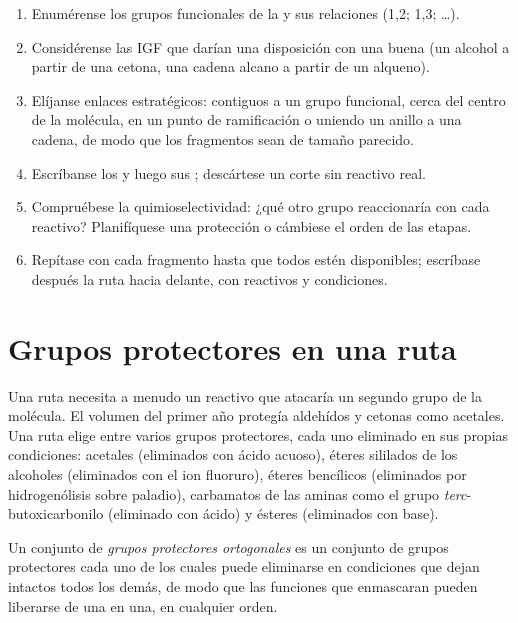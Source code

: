 \begin{method}\label{met:b2:retrosynthesis:retrosynthesis}
\begin{enumerate}
  \item Enumérense los grupos funcionales de la  y sus relaciones (1,2; 1,3; \dots).
  \item Considérense las IGF que darían una disposición con una buena  (un alcohol a partir de una cetona, una
        cadena alcano a partir de un alqueno).
  \item Elíjanse enlaces estratégicos: contiguos a un grupo funcional, cerca del centro de la molécula, en un
        punto de ramificación o uniendo un anillo a una cadena, de modo que los fragmentos sean de tamaño parecido.
  \item Escríbanse los  y luego sus ; descártese un corte sin reactivo real.
  \item Compruébese la quimioselectividad: ¿qué otro grupo reaccionaría con cada reactivo? Planifíquese una protección
        o cámbiese el orden de las etapas.
  \item Repítase con cada fragmento hasta que todos estén disponibles; escríbase después la ruta hacia delante, con reactivos y
        condiciones.
\end{enumerate}
\end{method}

\section{Grupos protectores en una ruta}

Una ruta necesita a menudo un reactivo que atacaría un segundo grupo de la molécula. El volumen del primer año
protegía aldehídos y cetonas como acetales. Una ruta elige entre varios grupos protectores, cada uno
eliminado en sus propias condiciones: acetales (eliminados con ácido acuoso), éteres sililados de los alcoholes (eliminados con el
ion fluoruro), éteres bencílicos (eliminados por hidrogenólisis sobre paladio), carbamatos de las aminas como
el grupo \textit{terc}-butoxicarbonilo (eliminado con ácido) y ésteres (eliminados con base).

\begin{definition}\label{def:b2:retrosynthesis:orthogonal}
Un conjunto de \emph{grupos protectores ortogonales} es un conjunto de grupos
protectores cada uno de los cuales puede eliminarse en condiciones que dejan intactos todos los demás, de modo que las funciones que enmascaran
pueden liberarse de una en una, en cualquier orden.
\end{definition}

